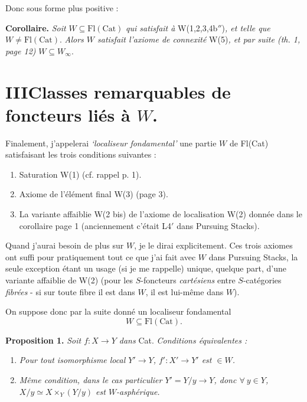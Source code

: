 \documentclass[11pt]{article}
\newcommand{\printedpage}[1]{\marginpar{\footnotesize p.~#1}}
\newcommand{\Cat}{\mathrm{Cat}}
\newcommand{\Fl}{\mathrm{Fl}}
\begin{document}
Donc sous forme plus positive :

\textbf{Corollaire.} \textit{Soit} $W \subseteq \Fl(\Cat)$ \textit{qui satisfait à} W(1,2,3,4b$''$)\textit{, et telle que} $W \neq \Fl(\Cat)$. \textit{Alors $W$ satisfait l'axiome de connexité} W(5)\textit{, et par suite (th. 1, page 12)} $W \subseteq W_\infty$.

\printedpage{19}

\section*{III\quad Classes remarquables de foncteurs liés à $W$.}

Finalement, j'appelerai \textit{‘localiseur fondamental’} une partie $W$ de Fl(Cat) satisfaisant les trois conditions suivantes : %

\begin{enumerate}
\item[(i)] Saturation W(1) (cf. rappel p. 1).
\item[(ii)] Axiome de l'élément final W(3) (page 3).
\item[(iii)] La variante affaiblie W(2 bis) de l'axiome de localisation W(2) donnée dans le corollaire page 1 (anciennement c'était L4$'$ dans Pursuing Stacks).
\end{enumerate}

Quand j'aurai besoin de plus sur $W$, je le dirai explicitement. Ces trois axiomes ont suffi pour pratiquement tout ce que j'ai fait avec $W$ dans Pursuing Stacks, la seule exception étant un usage (si je me rappelle) unique, quelque part, d'une variante affaiblie de W(2) (pour les $S$-foncteurs \textit{cartésiens} entre $S$-catégories \textit{fibrées} - si sur toute fibre il est dans $W$, il est lui-même dans $W$).

On suppose donc par la suite donné un localiseur fondamental
\[
W \subseteq \mathrm{Fl}(\mathrm{Cat}).
\]

\textbf{Proposition 1.} \textit{Soit $f : X \longrightarrow Y$ dans} \textup{Cat}. \textit{Conditions équivalentes :}

\begin{enumerate}
\item[\textit{a)}] \textit{Pour tout isomorphisme local $Y' \longrightarrow Y$, $f' : X' \longrightarrow Y'$ est $\in W$.}
\item[\textit{b)}] \textit{Même condition, dans le cas particulier $Y' = Y/y \longrightarrow Y$, donc $\forall\ y \in Y$, $X/y \simeq X \times_Y (Y/y)$ est $W$-asphérique.}
\end{enumerate}
\end{document}
